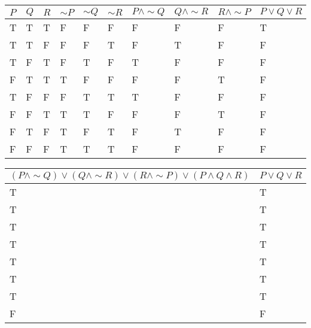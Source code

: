 \documentclass{article}
\begin{document}
\begin{center}
\begin{tabular}{|l|l|l|l|l|l|l|l|l|l|}
  \hline $P$ & $Q$ & $R$ & $\sim P$ & $\sim Q$ & $\sim R$ & $P\land \sim Q$ & $Q\land \sim R$ & $R\land \sim P$ & $P\lor Q\lor R$\\
  \hline T & T & T & F & F & F & F & F & F & T \\ 
  \hline T & T & F & F & F & T & F & T & F & F \\
  \hline T & F & T & F & T & F & T & F & F & F \\
  \hline F & T & T & T & F & F & F & F & T & F \\
  \hline T & F & F & F & T & T & T & F & F & F \\
  \hline F & F & T & T & T & F & F & F & T & F \\
  \hline F & T & F & T & F & T & F & T & F & F \\
  \hline F & F & F & T & T & T & F & F & F & F \\
  \hline
\end{tabular}
\begin{tabular}{|l|l|}
  \hline $(P\land\sim Q)\lor(Q\land\sim R)\lor(R\land\sim P)\lor(P\land Q\land R)$ & $P\lor Q\lor R$\\
  \hline T & T\\
  \hline T & T\\
  \hline T & T\\
  \hline T & T\\
  \hline T & T\\
  \hline T & T\\
  \hline T & T\\
  \hline F & F\\
  \hline
\end{tabular}
\end{center}
\end{document}
